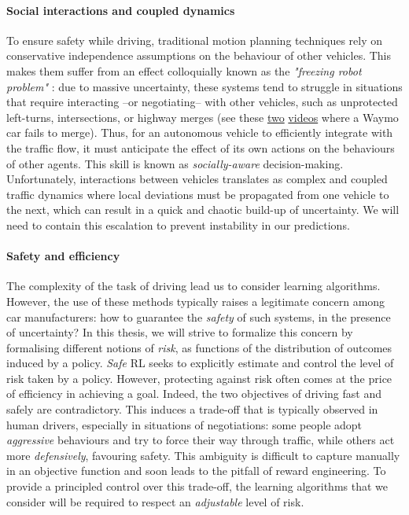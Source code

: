 \paragraph{Social interactions and coupled dynamics}

To ensure safety while driving, traditional motion planning techniques rely on conservative independence assumptions on the behaviour of other vehicles. This makes them suffer from an effect colloquially known as the \emph{"freezing robot problem"} \citep{Trautman2010}: due to massive uncertainty, these systems tend to struggle in situations that require interacting --or negotiating-- with other vehicles, such as unprotected left-turns, intersections, or highway merges (see \eg these \href{https://www.youtube.com/watch?v=HjtiiGCe1pE}{two} \href{https://twitter.com/nitguptaa/status/990683818825736192}{videos} where a Waymo car fails to merge). 
Thus, for an autonomous vehicle to efficiently integrate with the traffic flow, it must anticipate the effect of its own actions on the behaviours of other agents. This skill is known as \emph{socially-aware} decision-making. Unfortunately, interactions between vehicles translates as complex and coupled traffic dynamics where local deviations must be propagated from one vehicle to the next, which can result in a quick and chaotic build-up of uncertainty. We will need to contain this escalation to prevent instability in our predictions.

\paragraph{Safety and efficiency}

The complexity of the task of driving lead us to consider learning algorithms. However, the use of these methods typically raises a legitimate concern among car manufacturers: how to guarantee the \emph{safety} of such systems, in the presence of uncertainty? In this thesis, we will strive to formalize this concern by formalising different notions of \emph{risk}, as functions of the distribution of outcomes induced by a policy. \emph{Safe} \acl*{RL} seeks to explicitly estimate and control the level of risk taken by a policy.
However, protecting against risk often comes at the price of efficiency in achieving a goal. Indeed, the two objectives of driving fast and safely are contradictory. This induces a trade-off that is typically observed in human drivers, especially in situations of negotiations: some people adopt \emph{aggressive} behaviours and try to force their way through traffic, while others act more \emph{defensively}, favouring safety. This ambiguity is difficult to capture manually in an objective function and soon leads to the pitfall of reward engineering. To provide a principled control over this trade-off, the learning algorithms that we consider will be required to respect an \emph{adjustable} level of risk.

